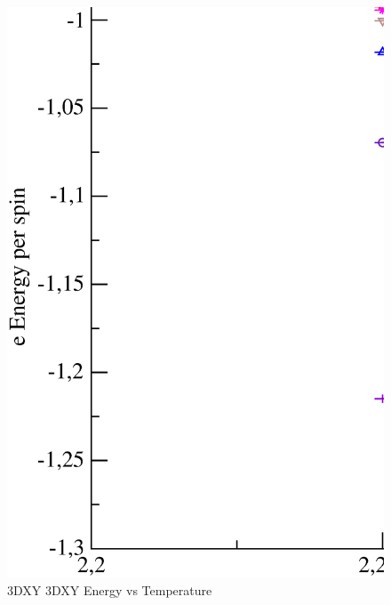 \begin{figure}[!htpb]
  \centering
  \includegraphics[width=\textwidth]{./plots/3DXY/3DXY_Energy_vs_Temperature.eps}
  \caption{3DXY 3DXY Energy vs Temperature}
\end{figure}

